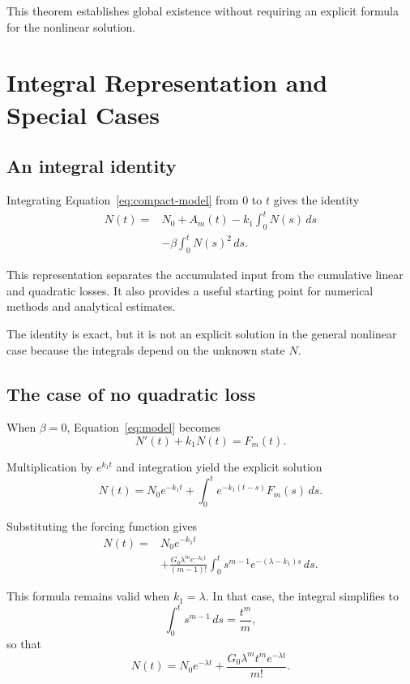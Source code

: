 \documentclass[12pt]{article}
\theoremstyle{definition}
\theoremstyle{remark}
\begin{document}
This theorem establishes global existence without
requiring an explicit formula for the nonlinear solution.

\section{Integral Representation and Special Cases}

\subsection{An integral identity}

Integrating Equation~\eqref{eq:compact-model} from
\(0\) to \(t\) gives the identity
\begin{equation}
\begin{aligned}
N(t)
={}&N_0+A_m(t)
-k_1\int_0^t N(s)\,ds\\
&-\beta\int_0^t N(s)^2\,ds.
\end{aligned}
\label{eq:integral-identity}
\end{equation}

This representation separates the accumulated input
from the cumulative linear and quadratic losses. It also
provides a useful starting point for numerical methods
and analytical estimates.

The identity is exact, but it is not an explicit solution
in the general nonlinear case because the integrals
depend on the unknown state \(N\).

\subsection{The case of no quadratic loss}

When \(\beta=0\), Equation~\eqref{eq:model} becomes
\[
N'(t)+k_1N(t)=F_m(t).
\]

Multiplication by \(e^{k_1t}\) and integration yield
the explicit solution
\begin{equation}
N(t)
=
N_0e^{-k_1t}
+
\int_0^t e^{-k_1(t-s)}F_m(s)\,ds.
\label{eq:linear-solution}
\end{equation}

Substituting the forcing function gives
\begin{align}
N(t)
={}&N_0e^{-k_1t}
\nonumber\\
&+
\frac{G_0\lambda^m e^{-k_1t}}{(m-1)!}
\int_0^t
s^{m-1}e^{-(\lambda-k_1)s}\,ds.
\label{eq:linear-solution-expanded}
\end{align}

This formula remains valid when \(k_1=\lambda\).
In that case, the integral simplifies to
\[
\int_0^t s^{m-1}\,ds=\frac{t^m}{m},
\]
so that
\begin{equation}
N(t)
=
N_0e^{-\lambda t}
+
\frac{G_0\lambda^m t^m e^{-\lambda t}}{m!}.
\label{eq:resonant-linear-solution}
\end{equation}
\end{document}
